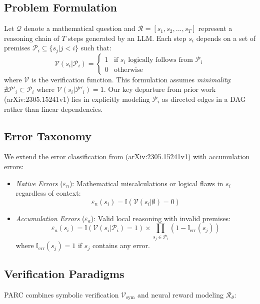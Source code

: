 \documentclass{article}
\begin{document}
\subsection*{Problem Formulation}
Let $\mathcal{Q}$ denote a mathematical question and $\mathcal{R} = [s_1, s_2, ..., s_T]$ represent a reasoning chain of $T$ steps generated by an LLM. Each step $s_i$ depends on a set of premises $\mathcal{P}_i \subseteq \{s_j | j < i\}$ such that:
\begin{equation}
\mathcal{V}(s_i|\mathcal{P}_i) = \begin{cases}
1 & \text{if } s_i \text{ logically follows from } \mathcal{P}_i \\
0 & \text{otherwise}
\end{cases}
\end{equation}
where $\mathcal{V}$ is the verification function. This formulation assumes \textit{minimality}: $\nexists \mathcal{P}'_i \subset \mathcal{P}_i$ where $\mathcal{V}(s_i|\mathcal{P}'_i) = 1$. Our key departure from prior work \cite{prasad2023receval} (arXiv:2305.15241v1) lies in explicitly modeling $\mathcal{P}_i$ as directed edges in a DAG rather than linear dependencies.

\subsection*{Error Taxonomy}
We extend the error classification from \cite{golovneva2023roscoe} (arXiv:2305.15241v1) with accumulation errors:

\begin{itemize}
\item \textit{Native Errors} ($\varepsilon_n$): Mathematical miscalculations or logical flaws in $s_i$ regardless of context:
\begin{equation}
\varepsilon_n(s_i) = \mathbb{I}(\mathcal{V}(s_i|\emptyset) = 0)
\end{equation}

\item \textit{Accumulation Errors} ($\varepsilon_a$): Valid local reasoning with invalid premises:
\begin{equation}
\varepsilon_a(s_i) = \mathbb{I}(\mathcal{V}(s_i|\mathcal{P}_i) = 1) \times \prod_{s_j \in \mathcal{P}_i} (1 - \mathbb{I}_{\text{err}}(s_j))
\end{equation}
where $\mathbb{I}_{\text{err}}(s_j) = 1$ if $s_j$ contains any error.
\end{itemize}

\subsection*{Verification Paradigms}
PARC combines symbolic verification $\mathcal{V}_{\text{sym}}$ and neural reward modeling $\mathcal{R}_{\theta}$:
\end{document}
